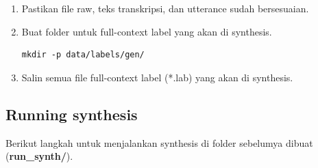 \documentclass[12pt,]{article}
\begin{document}
\begin{enumerate}
		\item Pastikan file raw, teks transkripsi, dan utterance sudah bersesuaian.

		\item Buat folder untuk full-context label yang akan di synthesis.
		\begin{verbatim}
mkdir -p data/labels/gen/
		\end{verbatim}

		\item Salin semua file full-context label (*.lab) yang akan di synthesis.

	\end{enumerate}

	\newpage
	\subsection{Running synthesis}

	Berikut langkah untuk menjalankan synthesis di folder sebelumya dibuat (\textbf{run\_synth/}).
\end{document}
